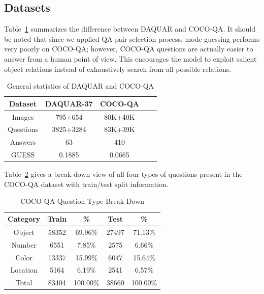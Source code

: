 \documentclass{article}
\renewcommand{\#}[1]{\textbf{#1}}
\begin{document}
\subsection{Datasets}
Table~\ref{tab:dataset_stats} summarizes the difference between DAQUAR and COCO-QA. It should be noted that since we applied QA pair selection process, mode-guessing performs very poorly on COCO-QA; however, COCO-QA questions are actually easier to answer from a human point of view. This encourages the model to exploit salient object relations instead of exhaustively search from all possible relations.

\begin{table}[h]
\label{tab:dataset_stats}
\caption{General statistics of DAQUAR and COCO-QA}
\vskip 0.15in
\begin{center}
\begin{small}
\begin{sc}
\begin{tabular}{c c c c c}
\hline
\abovespace\belowspace
Dataset        & DAQUAR-37 & COCO-QA \\
\hline
\abovespace
Images         & 795+654   & 80K+40K \\
Questions      & 3825+3284 & 83K+39K \\
Answers        & 63        & 410     \\
\belowspace
GUESS          & 0.1885    & 0.0665  \\
\hline
\end{tabular}
\end{sc}
\end{small}
\end{center}
\end{table}

Table~\ref{tab:dataset_category_stats} gives a break-down view of all four types of questions present in the COCO-QA dataset with train/test split information.

\begin{table}
\label{tab:dataset_category_stats}
\caption{COCO-QA Question Type Break-Down}
\vskip 0.15in
\begin{center}
\begin{small}
\begin{sc}
\begin{tabular}{c c c c c}
\hline
\abovespace\belowspace
Category & Train & \%       & Test  & \%       \\
\hline
\abovespace
Object   & 58352 & 69.96\%  & 27497 & 71.13\%  \\
Number   & 6551  & 7.85\%   & 2575  & 6.66\%   \\
Color    & 13337 & 15.99\%  & 6047  & 15.64\%  \\
\belowspace
Location & 5164  & 6.19\%   & 2541  & 6.57\%   \\
\hline
\belowspace
\abovespace
Total    & 83404 & 100.00\% & 38660 & 100.00\% \\
\hline
\end{tabular}
\end{sc}
\end{small}
\end{center}
\end{table}
\end{document}
